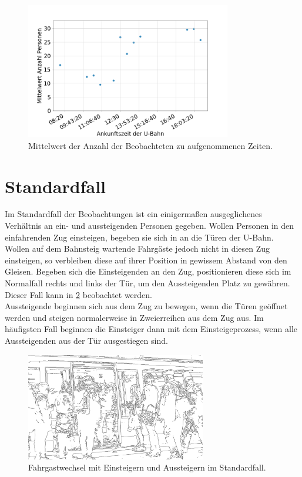 \begin{figure}[H]
	\centering
		\includegraphics[width=0.8\textwidth]{pictures/observation/recording/peopleOverTime.png}
	\caption{Mittelwert der Anzahl der Beobachteten zu aufgenommenen Zeiten.}
	\label{fig:PersonenUberZeit}
\end{figure}
\section{Standardfall}
Im Standardfall der Beobachtungen ist ein einigermaßen ausgeglichenes Verhältnis an ein- und aussteigenden Personen gegeben. Wollen Personen in den einfahrenden Zug einsteigen, begeben sie sich in an die Türen der U-Bahn. Wollen auf dem Bahnsteig wartende Fahrgäste jedoch nicht in diesen Zug einsteigen, so verbleiben diese auf ihrer Position in gewissem Abstand von den Gleisen. Begeben sich die Einsteigenden an den Zug, positionieren diese sich im Normalfall rechts und links der Tür, um den Aussteigenden Platz zu gewähren. Dieser Fall kann in \figurename \ref{fig:normalerFahrgastwechsel} beobachtet werden.\\
Aussteigende beginnen sich aus dem Zug zu bewegen, wenn die Türen geöffnet werden und steigen normalerweise in Zweierreihen aus dem Zug aus. Im häufigsten Fall beginnen die Einsteiger dann mit dem Einsteigeprozess, wenn alle Aussteigenden aus der Tür ausgestiegen sind.
\begin{figure}[H] 
	\centering
		\includegraphics[width=0.7\textwidth]{pictures/observation/standard/exchange.png} 
	\caption{Fahrgastwechsel mit Einsteigern und Aussteigern im Standardfall.}
	\label{fig:normalerFahrgastwechsel}
\end{figure} 
